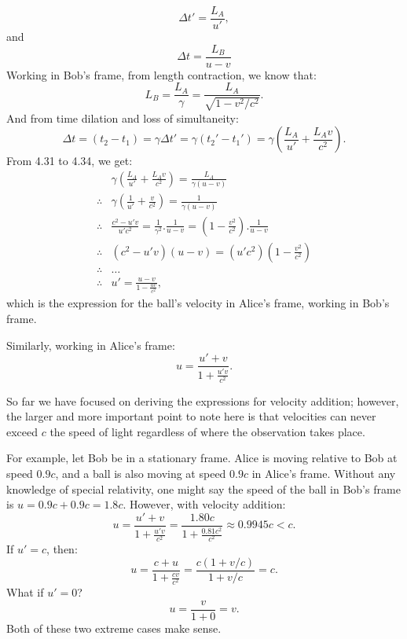 \documentclass[a4paper,11pt]{article}
\numberwithin{equation}{section}
\begin{document}
 \begin{equation}
 \Delta t' = \frac{L_A}{u'},
 \end{equation}
 and
 \begin{equation}
 \Delta t = \frac{L_B}{u - v}
 \end{equation}
 Working in Bob's frame, from length contraction, we know that:
 \begin{equation}
 L_B=\frac{L_A}{\gamma}=\frac{L_A}{\sqrt{1-v^2/c^2}}.
 \end{equation}
 And from time dilation and loss of simultaneity:  
 \begin{equation}
 \Delta t=(t_2-t_1)= \gamma \Delta t' = \gamma(t_2'-t_1')=\gamma\left(\frac{L_A}{u'} + \frac{L_A v}{c^2}\right). 
 \end{equation}
 From 4.31 to 4.34, we get:
 \begin{equation}
 \begin{split} 
 &\gamma\left(\frac{L_A}{u'} + \frac{L_A v}{c^2}\right) = \frac{L_A}{\gamma (u-v)} \\
 \therefore{}&\gamma\left( \frac{1}{u'} + \frac{v}{c^2} \right) = \frac{1}{\gamma (u-v)} \\
 \therefore{}& \frac{c^2-u'v}{u'c^2}=\frac{1}{\gamma^2}.\frac{1}{u-v}=\left(1-\frac{v^2}{c^2} \right).\frac{1}{u-v} \\
 \therefore{}&(c^2-u'v)(u-v)=(u'c^2)\left(1-\frac{v^2}{c^2} \right)\\
 \therefore{}&\dots\\
 \therefore{}&u'=\frac{u-v}{1-\frac{uv}{c^2}},
 \end{split}
 \end{equation}
 which is the expression for the ball's velocity in Alice's frame, working in Bob's frame.
 
 \noindent Similarly, working in Alice's frame:
 \begin{equation}
 u=\frac{u'+v}{1+\frac{u'v}{c^2}}.
 \end{equation}
 
 \noindent So far we have focused on deriving the expressions for velocity addition; however, the larger and more important point to note here is that velocities can never exceed $c$ the speed of light regardless of where the observation takes place. 
 
 \noindent For example, let Bob be in a stationary frame. Alice is moving relative to Bob at speed $0.9c$, and a ball is also moving at speed $0.9c$ in Alice's frame. Without any knowledge of special relativity, one might say the speed of the ball in Bob's frame is $u = 0.9c + 0.9c = 1.8c$. However, with velocity addition:
 \begin{equation}
 u = \frac{u'+v}{1+\frac{u'v}{c^2}} = \frac{1.80c}{1+\frac{0.81c^2}{c^2}} \approx 0.9945c < c.
 \end{equation}
 If $u'=c$, then:
 \begin{equation}
 u=\frac{c+u}{1+\frac{cv}{c^2}}=\frac{c(1+v/c)}{1+v/c}=c.
 \end{equation}
 What if $u'=0$?
 \begin{equation}
 u=\frac{v}{1+0}=v.
 \end{equation}
 Both of these two extreme cases make sense. 
 
\end{document}
